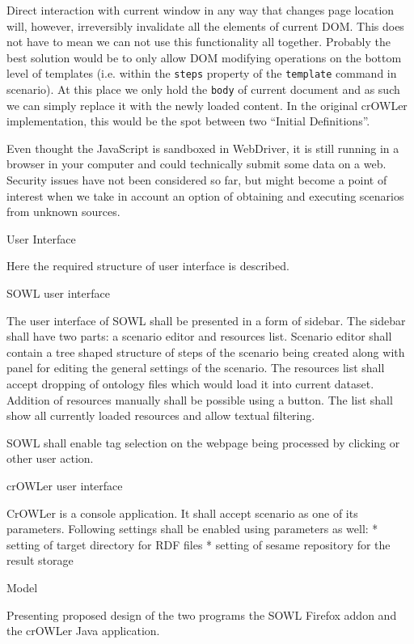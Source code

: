 Direct interaction with current window in any way that changes page location
will, however, irreversibly invalidate all the elements of current DOM. This
does not have to mean we can not use this functionality all together. Probably the
best solution would be to only allow DOM modifying operations on the bottom
level of templates (i.e. within the {\tt steps} property of the {\tt template}
command in scenario). At this place we only hold the {\tt body} of current
document and as such we can simply replace it with the newly loaded content. 
In the original crOWLer implementation, this would be the spot between two
``Initial Definitions''. 

Even thought the JavaScript is sandboxed in WebDriver, it is still running in a
browser in your computer and could technically submit some data on a web.
Security issues have not been considered so far, but might become a point of
interest when we take in account an option of obtaining and executing scenarios
from unknown sources. 


\sec User Interface

Here the required structure of user interface is described. 

\secc SOWL user interface

The user interface of SOWL shall be presented in a form of sidebar. The sidebar
shall have two parts: a scenario editor and resources list. Scenario editor
shall contain a tree shaped structure of steps of the scenario being created
along with panel for editing the general settings of the scenario. The
resources list shall accept dropping of ontology files which would load it into
current dataset. Addition of resources manually shall be possible using a
button. The list shall show all currently loaded resources and allow textual
filtering. 

SOWL shall enable tag selection on the webpage being processed by clicking or
other user action. 


\secc crOWLer user interface

CrOWLer is a console application. It shall accept scenario as one of its parameters. 
Following settings shall be enabled using parameters as well:
\begitems
  * setting of target directory for RDF files
  * setting of sesame repository for the result storage
\enditems


\sec Model

Presenting proposed design of the two programs the SOWL Firefox addon and the
crOWLer Java application. 

